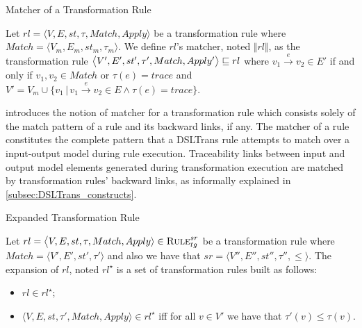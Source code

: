 \begin{definition}{Matcher of a Transformation Rule\\}
\label{def:back_match_transformation_rule}

Let $rl = \big\langle V,E,st,\tau, Match,Apply\big\rangle$ be a transformation rule where $Match =\langle V_m, E_m, st_m, \tau_m\rangle$. We define $rl$'s matcher, noted $\Vert rl\Vert$, as the transformation rule $\big\langle V',E',st',\tau',Match,\\Apply'\big\rangle\sqsubseteq rl$ where $v_1\xrightarrow{e} v_2\in E'$ if and only if $v_1,v_2\in Match$ or $\tau(e)=trace$ and $V'=V_m\cup \big\{v_1\,|\,v_1\xrightarrow{e} v_2\in E \land \tau(e)=trace\big\}$.
\end{definition}



 introduces the notion of matcher for a transformation rule which consists solely of the match pattern of a rule and its backward links, if any. The matcher of a rule constitutes the complete pattern that a DSLTrans rule attempts to match over a input-output model during rule execution. Traceability links between input and output model elements generated during transformation execution are matched by transformation rules' backward links, as informally explained in \cref{subsec:DSLTrans_constructs}.


\begin{definition}{Expanded Transformation Rule\\}
\label{def:transformation_rule_expansion}

Let $rl = \big\langle V,E,st,\tau,Match,Apply\rangle \in \textsc{Rule}^{sr}_{tg}$ be a transformation rule where $Match = \langle V',E',st',\tau'\rangle$ and also we have that $sr =\langle V'',E'',st'',\tau'',\leq \rangle$. The expansion of $rl$, noted $rl^{\star}$ is a set of transformation rules built as follows:
\begin{itemize}
  \item $rl\in rl^{\star}$;
  \item $\big\langle V,E,st,\tau',Match,Apply\rangle\in rl^{\star}$ iff for all $v\in V'$ we have that $\tau'(v)\leq \tau(v)$.
\end{itemize}
\end{definition}

